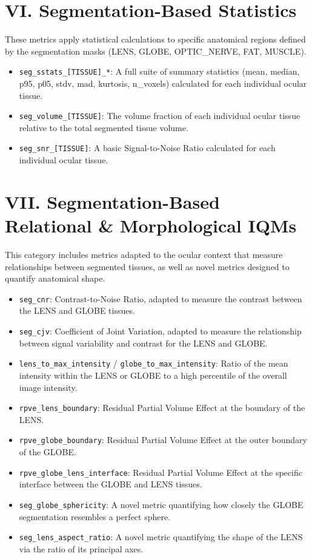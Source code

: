 \section*{VI. Segmentation-Based Statistics}
These metrics apply statistical calculations to specific anatomical regions defined by the segmentation masks (LENS, GLOBE, OPTIC\_NERVE, FAT, MUSCLE).
\begin{itemize}
    \item \texttt{seg\_sstats\_[TISSUE]\_*}: A full suite of summary statistics (mean, median, p95, p05, stdv, mad, kurtosis, n\_voxels) calculated for each individual ocular tissue.
    \item \texttt{seg\_volume\_[TISSUE]}: The volume fraction of each individual ocular tissue relative to the total segmented tissue volume.
    \item \texttt{seg\_snr\_[TISSUE]}: A basic Signal-to-Noise Ratio calculated for each individual ocular tissue.
\end{itemize}

\section*{VII. Segmentation-Based Relational \& Morphological IQMs}
This category includes metrics adapted to the ocular context that measure relationships between segmented tissues, as well as novel metrics designed to quantify anatomical shape.
\begin{itemize}
    \item \texttt{seg\_cnr}: Contrast-to-Noise Ratio, adapted to measure the contrast between the LENS and GLOBE tissues.
    \item \texttt{seg\_cjv}: Coefficient of Joint Variation, adapted to measure the relationship between signal variability and contrast for the LENS and GLOBE.
    \item \texttt{lens\_to\_max\_intensity} / \texttt{globe\_to\_max\_intensity}: Ratio of the mean intensity within the LENS or GLOBE to a high percentile of the overall image intensity.
    \item \texttt{rpve\_lens\_boundary}: Residual Partial Volume Effect at the boundary of the LENS.
    \item \texttt{rpve\_globe\_boundary}: Residual Partial Volume Effect at the outer boundary of the GLOBE.
    \item \texttt{rpve\_globe\_lens\_interface}: Residual Partial Volume Effect at the specific interface between the GLOBE and LENS tissues.
    \item \texttt{seg\_globe\_sphericity}: A novel metric quantifying how closely the GLOBE segmentation resembles a perfect sphere.
    \item \texttt{seg\_lens\_aspect\_ratio}: A novel metric quantifying the shape of the LENS via the ratio of its principal axes.
\end{itemize}


